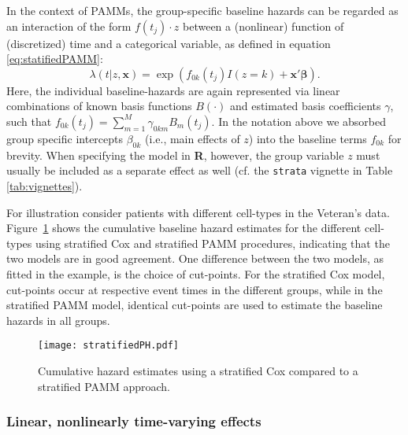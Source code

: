 \documentclass[submit]{smj}
\newcommand{\bfx}{\mathbf{x}}
\newcommand{\bsbeta}{\boldsymbol{\beta}}
\newcommand{\Rlang}{\textbf{\textsf{R}}}
\newcommand{\code}[1]{{\small \texttt{#1}}}
\begin{document}
In the context of PAMMs, the group-specific baseline hazards can be regarded as an
interaction of the form $f(t_j)\cdot z$ between a (nonlinear) function of (discretized) time
and a categorical variable, as defined in equation \eqref{eq:statifiedPAMM}:
\begin{equation}\label{eq:statifiedPAMM}
\lambda(t|z, \bfx) = \exp
\left(
   f_{0k}(t_j)I(z=k) + \bfx'\bsbeta
\right).
\end{equation}
Here, the individual baseline-hazards are again represented via linear
combinations of known basis functions $B(\cdot)$ and estimated basis coefficients
$\gamma$, such that $f_{0k}(t_j)=\sum_{m=1}^{M}\gamma_{0km}B_m(t_j)$. In the
notation above we absorbed group specific intercepts $\beta_{0k}$
(i.e., main effects of $z$) into the baseline terms $f_{0k}$ for brevity.
When specifying the model in \Rlang, however, the group variable $z$ must
usually be included as a separate effect as well
(cf. the \code{strata} vignette in Table \ref{tab:vignettes}).


For illustration consider patients with different cell-types in the Veteran's data.
Figure~\ref{fig:stratifiedPH} shows the cumulative baseline hazard estimates for the
different cell-types using stratified Cox and stratified PAMM procedures,
indicating that the two models are in good agreement. One difference
between the two models, as fitted in the example, is the choice of cut-points.
For the stratified Cox model, cut-points occur at respective event times in the
different groups, while in the stratified PAMM model, identical cut-points
are used to estimate the baseline hazards in all groups.


\begin{figure}[!h]
\begin{center}
\texttt{[image: stratifiedPH.pdf]}
\end{center}
\vspace{-30pt}
\caption{Cumulative hazard estimates using a stratified Cox compared to a
stratified PAMM approach.}
\label{fig:stratifiedPH}
\end{figure}

\subsubsection{Linear, nonlinearly time-varying effects}\label{sssec:linNLtv}
\end{document}
